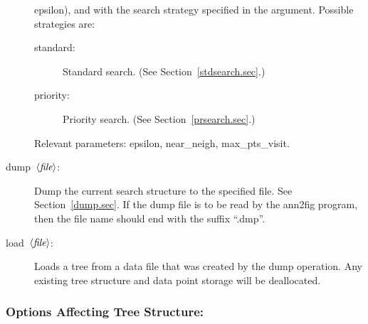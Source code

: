 \documentclass[11pt]{article}		%
\newcommand\ang[1]{\langle #1\rangle}
\newcommand{\annfig}[0]{\textsf{ann2fig}}
\newcommand{\FILE}[0]{$\ang{\textit{file}\/}$}
\begin{document}
\begin{description}
	\textsf{epsilon}), and with the search strategy specified in the
	argument.  Possible strategies are:
	\begin{description}
	\item[\hbox{\sf standard:}]
		Standard search.  (See Section~\ref{stdsearch.sec}.)
	\item[\hbox{\sf priority:}]
		Priority search.  (See Section~\ref{prsearch.sec}.)
	\end{description}
	Relevant parameters: \textsf{epsilon}, \textsf{near\_neigh},
	\textsf{max\_pts\_visit}.
\item[\hbox{\sf dump \FILE:}]
	Dump the current search structure to the specified file.  See
	Section~\ref{dump.sec}.  If the dump file is to be read by the
	{\annfig} program, then the file name should end with the suffix
	``.dmp''.
\item[\hbox{\sf load \FILE:}]
	Loads a tree from a data file that was created by the dump
	operation.	Any existing tree structure and data point storage
	will be deallocated.
\end{description}

\subsubsection{Options Affecting Tree Structure:}
\end{document}
